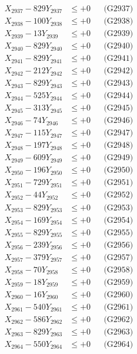 \documentclass[a4paper,10pt]{article}
\begin{document}
{\begin{align}
X_{2937} - 829Y_{2937} &\leq +0 && \text{(G2937)} \\
X_{2938} - 100Y_{2938} &\leq +0 && \text{(G2938)} \\
X_{2939} - 13Y_{2939} &\leq +0 && \text{(G2939)} \\
X_{2940} - 829Y_{2940} &\leq +0 && \text{(G2940)} \\
\allowbreak
X_{2941} - 829Y_{2941} &\leq +0 && \text{(G2941)} \\
X_{2942} - 212Y_{2942} &\leq +0 && \text{(G2942)} \\
X_{2943} - 829Y_{2943} &\leq +0 && \text{(G2943)} \\
X_{2944} - 525Y_{2944} &\leq +0 && \text{(G2944)} \\
X_{2945} - 313Y_{2945} &\leq +0 && \text{(G2945)} \\
X_{2946} - 74Y_{2946} &\leq +0 && \text{(G2946)} \\
X_{2947} - 115Y_{2947} &\leq +0 && \text{(G2947)} \\
X_{2948} - 197Y_{2948} &\leq +0 && \text{(G2948)} \\
X_{2949} - 609Y_{2949} &\leq +0 && \text{(G2949)} \\
X_{2950} - 196Y_{2950} &\leq +0 && \text{(G2950)} \\
\allowbreak
X_{2951} - 729Y_{2951} &\leq +0 && \text{(G2951)} \\
X_{2952} - 44Y_{2952} &\leq +0 && \text{(G2952)} \\
X_{2953} - 829Y_{2953} &\leq +0 && \text{(G2953)} \\
X_{2954} - 169Y_{2954} &\leq +0 && \text{(G2954)} \\
X_{2955} - 829Y_{2955} &\leq +0 && \text{(G2955)} \\
X_{2956} - 239Y_{2956} &\leq +0 && \text{(G2956)} \\
X_{2957} - 379Y_{2957} &\leq +0 && \text{(G2957)} \\
X_{2958} - 70Y_{2958} &\leq +0 && \text{(G2958)} \\
X_{2959} - 18Y_{2959} &\leq +0 && \text{(G2959)} \\
X_{2960} - 16Y_{2960} &\leq +0 && \text{(G2960)} \\
\allowbreak
X_{2961} - 540Y_{2961} &\leq +0 && \text{(G2961)} \\
X_{2962} - 586Y_{2962} &\leq +0 && \text{(G2962)} \\
X_{2963} - 829Y_{2963} &\leq +0 && \text{(G2963)} \\
X_{2964} - 550Y_{2964} &\leq +0 && \text{(G2964)} \\

\end{align}}
\end{document}
